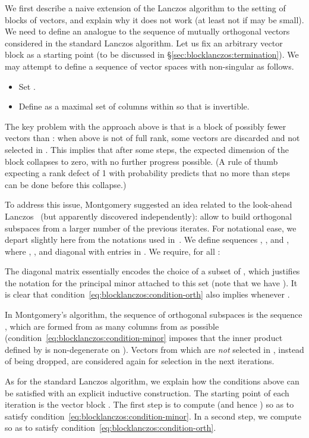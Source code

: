We first describe a naive extension of the Lanczos algorithm to the
setting of blocks of vectors, and explain why it does not work (at least
not if  may be small).
We need to define an analogue to the sequence of mutually orthogonal
vectors  considered in the standard Lanczos algorithm.
Let us fix an arbitrary vector block   as a starting point (to be
discussed in §\ref{sec:blocklanczos:termination}).
We may attempt to define a sequence of vector spaces with
 non-singular as follows.
\begin{itemize}
    \item Set .
    \item Define  as a maximal set of columns within
         so that  is
        invertible.
\end{itemize}
The key problem with the approach above is that  is
a block of possibly fewer vectors than : when
 above is not of full rank, some vectors are
discarded and not selected in . This implies that
after
some steps, the expected dimension of the block
 collapses to zero, with no further progress
possible. (A rule of thumb expecting a rank defect of 1 with
probability  predicts that no more than  steps can be done
before this collapse.)


To address this issue, Montgomery suggested an idea related to 
the look-ahead Lanczos~\cite{PaTaLi85} (but apparently discovered
independently): allow to build orthogonal subspaces
from a larger number of the previous iterates.
For notational
ease, we depart slightly here from the notations used
in~\cite{EC:Montgomery95}.
We define sequences , , and
, where ,
, and 
diagonal with entries in .
We require, for all :

The diagonal matrix
 essentially encodes the choice of a subset of
, which justifies the notation
 for the principal minor
attached to this set
(note that we have ).
It is clear that
condition~\eqref{eq:blocklanczos:condition-orth} also implies
 whenever .

In Montgomery's algorithm, the sequence of orthogonal subspaces is the
sequence , which are formed from as many columns from  as
possible (condition~\ref{eq:blocklanczos:condition-minor} imposes that
the inner product defined by  is non-degenerate on
). Vectors from  which are \emph{not}
selected in , instead of being dropped, are considered again
for selection in the next iterations.


As for the standard Lanczos algorithm, we explain how the conditions
above can be satisfied with an explicit inductive construction. The
starting point of each iteration is the vector block . The first
step is to compute   (and hence ) so as to satisfy
condition~\eqref{eq:blocklanczos:condition-minor}.
In a second step, we
compute  so as to satisfy
condition~\eqref{eq:blocklanczos:condition-orth}.

